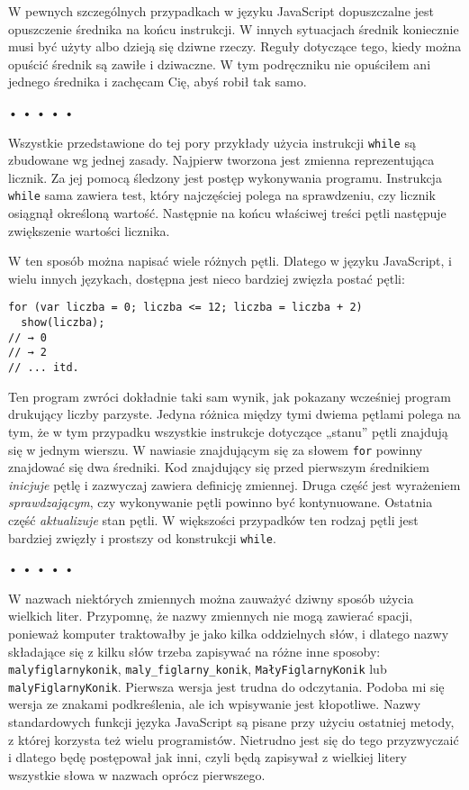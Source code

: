     
W pewnych szczególnych przypadkach w języku JavaScript dopuszczalne jest opuszczenie średnika na końcu instrukcji. W innych sytuacjach średnik koniecznie musi być użyty albo dzieją się dziwne rzeczy. Reguły dotyczące tego, kiedy można opuścić średnik są zawiłe i dziwaczne. W tym podręczniku nie opuściłem ani jednego średnika i zachęcam Cię, abyś robił tak samo.

  
\begin{center}
• • • • •
\end{center}
  
    
Wszystkie przedstawione do tej pory przykłady użycia instrukcji \texttt{while} są zbudowane wg jednej zasady. Najpierw tworzona jest zmienna reprezentująca licznik. Za jej pomocą śledzony jest postęp wykonywania programu. Instrukcja \texttt{while} sama zawiera test, który najczęściej polega na sprawdzeniu, czy licznik osiągnął określoną wartość. Następnie na końcu właściwej treści pętli następuje zwiększenie wartości licznika.

    
W ten sposób można napisać wiele różnych pętli. Dlatego w języku JavaScript, i wielu innych językach, dostępna jest nieco bardziej zwięzła postać pętli:

\begin{verbatim} 
for (var liczba = 0; liczba <= 12; liczba = liczba + 2)
  show(liczba);
// → 0
// → 2
// ... itd.
\end{verbatim}
    
Ten program zwróci dokładnie taki sam wynik, jak pokazany wcześniej program drukujący liczby parzyste. Jedyna różnica między tymi dwiema pętlami polega na tym, że w tym przypadku wszystkie instrukcje dotyczące „stanu” pętli znajdują się w jednym wierszu. W nawiasie znajdującym się za słowem \texttt{for} powinny znajdować się dwa średniki. Kod znajdujący się przed pierwszym średnikiem \emph{inicjuje} pętlę i zazwyczaj zawiera definicję zmiennej. Druga część jest wyrażeniem \emph{sprawdzającym}, czy wykonywanie pętli powinno być kontynuowane. Ostatnia część \emph{aktualizuje} stan pętli. W większości przypadków ten rodzaj pętli jest bardziej zwięzły i prostszy od konstrukcji \texttt{while}.

  
\begin{center}
• • • • •
\end{center}
  
    
W nazwach niektórych zmiennych można zauważyć dziwny sposób użycia wielkich liter. Przypomnę, że nazwy zmiennych nie mogą zawierać spacji, ponieważ komputer traktowałby je jako kilka oddzielnych słów, i dlatego nazwy składające się z kilku słów trzeba zapisywać na różne inne sposoby: \texttt{malyfiglarnykonik}, \texttt{maly\_figlarny\_konik}, \texttt{MałyFiglarnyKonik} lub \texttt{malyFiglarnyKonik}. Pierwsza wersja jest trudna do odczytania. Podoba mi się wersja ze znakami podkreślenia, ale ich wpisywanie jest kłopotliwe. Nazwy standardowych funkcji języka JavaScript są pisane przy użyciu ostatniej metody, z której korzysta też wielu programistów. Nietrudno jest się do tego przyzwyczaić i dlatego będę postępował jak inni, czyli będą zapisywał z wielkiej litery wszystkie słowa w nazwach oprócz pierwszego.

